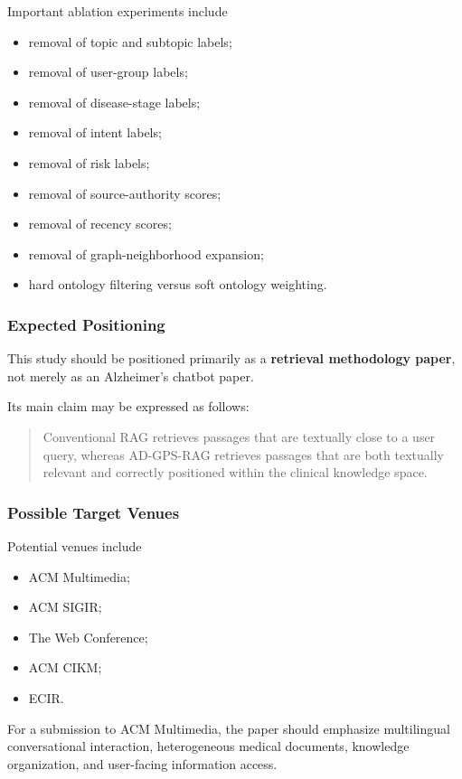 \documentclass{article}
\begin{document}
Important ablation experiments include
\begin{itemize}
    \item removal of topic and subtopic labels;
    \item removal of user-group labels;
    \item removal of disease-stage labels;
    \item removal of intent labels;
    \item removal of risk labels;
    \item removal of source-authority scores;
    \item removal of recency scores;
    \item removal of graph-neighborhood expansion;
    \item hard ontology filtering versus soft ontology weighting.
\end{itemize}

\subsubsection{Expected Positioning}
This study should be positioned primarily as a \textbf{retrieval methodology paper}, not merely as an Alzheimer's chatbot paper.

Its main claim may be expressed as follows:
\begin{quote}
Conventional RAG retrieves passages that are textually close to a user query,
whereas AD-GPS-RAG retrieves passages that are both textually relevant and
correctly positioned within the clinical knowledge space.
\end{quote}

\subsubsection{Possible Target Venues}
Potential venues include
\begin{itemize}
    \item ACM Multimedia;
    \item ACM SIGIR;
    \item The Web Conference;
    \item ACM CIKM;
    \item ECIR.
\end{itemize}

For a submission to ACM Multimedia, the paper should emphasize multilingual conversational interaction, heterogeneous medical documents, knowledge organization, and user-facing information access.
\end{document}
